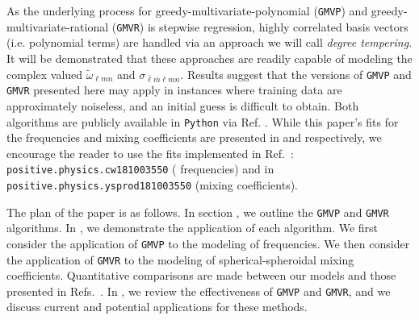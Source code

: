 \documentclass[twocolumn,aps,prd,floatfix,preprintnumbers,a4paper,nofootinbib,
superscriptaddress,10pt]{revtex4-1}
\newcommand{\cw}{\tilde{\omega}}
\def\lmn{_{\ell m n}}
\def\LMlmn{_{\bar{\ell} \bar{m} \ell m n}}
\def\gmvp#1{greedy-multivariate-polynomial#1
  (\texttt{GMVP}#1)\gdef\gmvp{\texttt{GMVP}}}
\def\gmvr#1{greedy-multivariate-rational#1
  (\texttt{GMVR}#1)\gdef\gmvr{\texttt{GMVR}}}
\begin{document}
%
As the underlying process for \gmvp{} and \gmvr{} is stepwise regression, highly correlated basis vectors (i.e. polynomial terms) are handled via an approach we will call \textit{degree tempering}.
%
It will be demonstrated that these approaches are readily capable of modeling the complex valued $\cw\lmn$ and $\sigma\LMlmn$.
%
Results suggest that the versions of \gmvp{} and \gmvr{} presented here may apply in instances where training data are approximately noiseless, and an initial guess is difficult to obtain.
%
Both algorithms are publicly available in \texttt{Python} via Ref. \cite{lionel_london_2018_1402516}.
%
While this paper's fits for the \qnm{} frequencies and mixing coefficients are presented in  and   respectively, we encourage the reader to use the fits implemented in Ref.~\cite{lionel_london_2018_1402516}: \texttt{positive.physics.cw181003550} (\qnm{} frequencies) and in \texttt{positive.physics.ysprod181003550} (mixing coefficients).
%
%
\par The plan of the paper is as follows.
%
In section , we outline the \gmvp{} and \gmvr{} algorithms.
%
In , we demonstrate the application of each algorithm.
%
We first consider the application of \gmvp{} to the modeling of \qnm{} frequencies.
%
We then consider the application of \gmvr{} to the modeling of spherical-spheroidal mixing coefficients.
%
Quantitative comparisons are made between our models and those presented in Refs.~\cite{Berti:2005ys, Berti:2014fga}.
%
In , we review the effectiveness of \gmvp{} and \gmvr{}, and we discuss current and potential applications for these methods.
%
%
\end{document}
